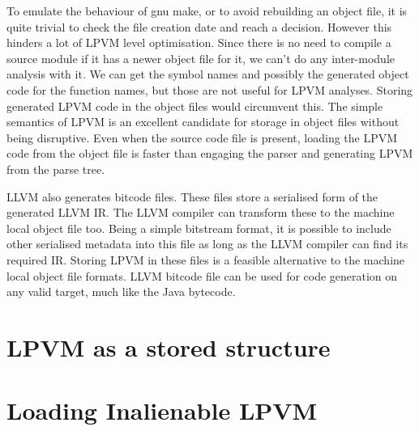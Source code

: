 To emulate the behaviour of gnu make, or to avoid rebuilding an object file, it
is quite trivial to check the file creation date and reach a decision. However
this hinders a lot of LPVM level optimisation. Since there is no need to
compile a source module if it has a newer object file for it, we can't do any
inter-module analysis with it. We can get the symbol names and possibly the
generated object code for the function names, but those are not useful for LPVM
analyses. Storing generated LPVM code in the object files would circumvent
this. The simple semantics of LPVM is an excellent candidate for storage in
object files without being disruptive. Even when the source code file is
present, loading the LPVM code from the object file is faster than engaging the
parser and generating LPVM from the parse tree.

LLVM also generates bitcode files. These files store a serialised form of the
generated LLVM IR. The LLVM compiler can transform these to the machine local
object file too. Being a simple bitstream format, it is possible to include
other serialised metadata into this file as long as the LLVM compiler can find
its required IR. Storing LPVM in these files is a feasible alternative to the
machine local object file formats. LLVM bitcode file can be used for code
generation on any valid target, much like the Java bytecode. 

\section{LPVM as a stored structure}


\section{Loading Inalienable LPVM}


